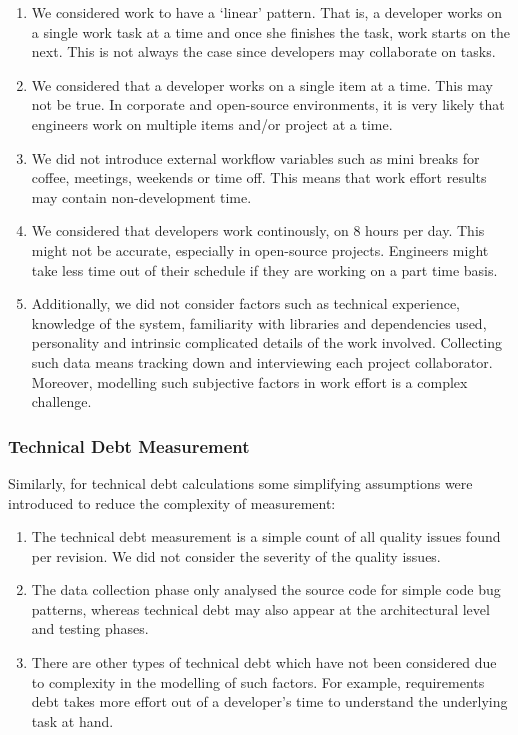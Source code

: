 \documentclass{mpaper}
\begin{document}
\begin{enumerate}
  \item We considered work to have a `linear' pattern. That is, a developer
  works on a single work task at a time and once she finishes the task, work
  starts on the next. This is not always the case since developers may
  collaborate on tasks.

  \item We considered that a developer works on a single item at a time. This
  may not be true. In corporate and open-source environments, it is very likely
  that engineers work on multiple items and/or project at a time.

  \item We did not introduce external workflow variables such as mini breaks for
  coffee, meetings, weekends or time off. This means that work effort results
  may contain non-development time. 

  \item We considered that developers work continously, on 8 hours per day. This
  might not be accurate, especially in open-source projects. Engineers might
  take less time out of their schedule if they are working on a part time basis.

  \item Additionally, we did not consider factors such as technical experience,
  knowledge of the system, familiarity with libraries and dependencies used,
  personality and intrinsic complicated details of the work involved.
  Collecting such data means tracking down and interviewing each project
  collaborator. Moreover, modelling such subjective factors in work effort is a
  complex challenge. 
\end{enumerate}

\subsubsection*{Technical Debt Measurement}
\label{validity-td}

Similarly, for technical debt calculations some simplifying assumptions were
introduced to reduce the complexity of measurement:

\begin{enumerate}
  \item The technical debt measurement is a simple count of all quality issues
  found per revision. We did not consider the severity of the quality issues.
  \item The data collection phase only analysed the source code for simple code
  bug patterns, whereas technical debt may also appear at the architectural
  level and testing phases.
 \item There are other types of technical debt which have not been considered
  due to complexity in the modelling of such factors. For example, requirements
  debt takes more effort out of a developer's time to understand the underlying
  task at hand.
\end{enumerate}
\end{document}
